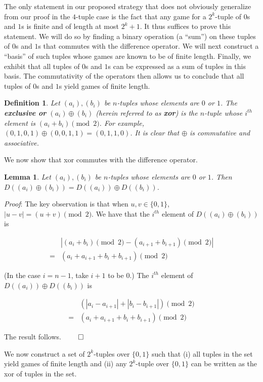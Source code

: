 \documentclass[12pt]{amsart}
\newtheorem{definition}[theorem]{Definition}
\newtheorem{lemma}[theorem]{Lemma}
\newcommand{\xor}{\oplus}
\begin{document}
The only statement in our proposed strategy that does not obviously generalize from our proof in the $4$-tuple case is the fact that any game for a $2^k$-tuple of $0$s and $1$s is finite and of length at most $2^k+1$. It thus suffices to prove this statement. We will do so by finding a binary operation (a ``sum'') on these tuples of $0$s and $1$s that commutes with the difference operator. We will next construct a ``basis'' of such tuples whose games are known to be of finite length. Finally, we exhibit that all tuples of $0$s and $1$s can be expressed as a sum of tuples in this basis. The commutativity of the operators then allows us to conclude that all tuples of $0$s and $1$s yield games of finite length.

\begin{definition}
Let $(a_i),(b_i)$ be $n$-tuples whose elements are $0$ or $1$. The \textbf{exclusive or} $(a_i)\xor (b_i)$ (herein referred to as \textbf{xor}) is the $n$-tuple whose $i^{th}$ element is $(a_i+b_i)\pmod{2}$. For example, $(0,1,0,1)\xor(0,0,1,1)=(0,1,1,0)$. It is clear that $\xor$ is commutative and associative.
\end{definition}

We now show that xor commutes with the difference operator.

\begin{lemma}
Let $(a_i),(b_i)$ be $n$-tuples whose elements are $0$ or $1$. Then $D((a_i)\xor (b_i))=D((a_i))\xor D((b_i))$.
\end{lemma}

\textit{Proof}: The key observation is that when $u,v\in \{0,1\}$, $|u-v|=(u+v)\pmod{2}$. We have that the $i^{th}$ element of $D((a_i)\xor (b_i))$ is

$$\begin{array}{cl}
& |(a_i+b_i)\pmod{2} - (a_{i+1}+b_{i+1})\pmod{2}| \\
= & (a_i+a_{i+1}+b_i+b_{i+1})\pmod{2}
\end{array}$$

(In the case $i=n-1$, take $i+1$ to be $0$.) The $i^{th}$ element of $D((a_i))\xor D((b_i))$ is

$$\begin{array}{cl}
& (|a_i-a_{i+1}|+|b_i-b_{i+1}|)\pmod{2} \\
= & (a_i+a_{i+1}+b_i+b_{i+1})\pmod{2}
\end{array}$$

The result follows. $\qed$

We now construct a set of $2^k$-tuples over $\{0,1\}$ such that (i) all tuples in the set yield games of finite length and (ii) any $2^k$-tuple over $\{0,1\}$ can be written as the xor of tuples in the set.
\end{document}
